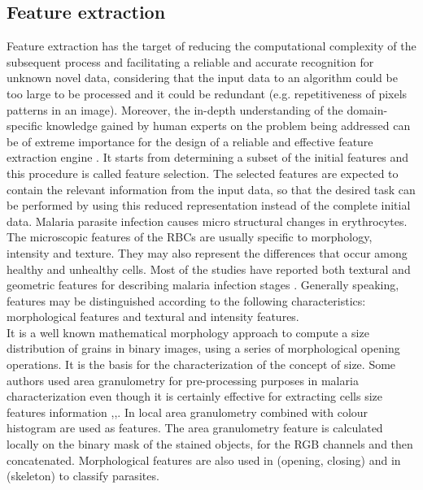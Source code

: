 \documentclass[sensors,review,submit,moreauthors,pdftex,10pt,a4paper]{mdpi}
\begin{document}
	\subsection{Feature extraction}
	Feature extraction has the target of reducing the computational complexity of the subsequent process and facilitating a reliable and accurate recognition for unknown novel data, considering that the input data to an algorithm could be too large to be processed and it could be redundant (e.g. repetitiveness of pixels patterns in an image). Moreover, the in-depth understanding of the domain-specific knowledge gained by human experts on the problem being addressed can be of extreme importance for the design of a reliable and effective feature extraction engine \cite{Jiang2009}.
	It starts from determining a subset of the initial features and this procedure is called feature selection. The selected features are expected to contain the relevant information from the input data, so that the desired task can be performed by using this reduced representation instead of the complete initial data.
	Malaria parasite infection causes micro structural changes in erythrocytes. The microscopic features of the RBCs are usually specific to morphology, intensity and texture. They may also represent the differences that occur among healthy and unhealthy cells. Most of the studies have reported both textural and geometric features for describing malaria infection stages \cite{Das2015}.
	Generally speaking, features may be distinguished according to the following characteristics: morphological features and textural and intensity features.\\
	It is a well known mathematical morphology approach to compute a size distribution of grains in binary images, using a series of morphological opening operations. It is the basis for the characterization of the concept of size. Some authors used area granulometry for pre-processing purposes in malaria characterization \cite{Tek2010} even though it is certainly effective for extracting cells size features information \cite{Tek2006},\cite{Malihi2013},\cite{Springl2009}. In \cite{Tek2010} local area granulometry combined with colour histogram are used as features. The area granulometry feature is calculated locally on the binary mask of the stained objects, for the RGB channels and then concatenated. Morphological features are also used
	in \cite{Das2011} (opening, closing) and in \cite{DiRuberto2002} (skeleton) to classify parasites.
	
\end{document}
